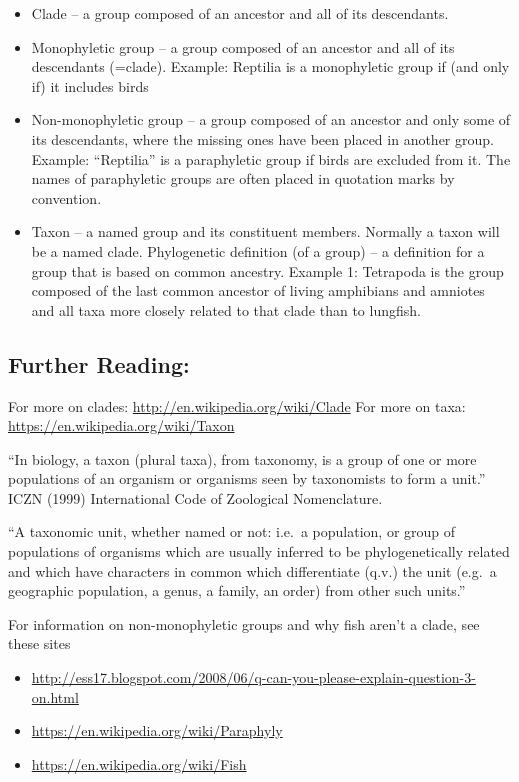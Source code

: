 \documentclass[
]{book}
\providecommand{\tightlist}{%
  \setlength{\itemsep}{0pt}\setlength{\parskip}{0pt}}
\begin{document}
\begin{itemize}
\tightlist
\item
  Clade -- a group composed of an ancestor and all of its descendants.
\item
  Monophyletic group -- a group composed of an ancestor and all of its descendants (=clade). Example: Reptilia is a monophyletic group if (and only if) it includes birds
\item
  Non-monophyletic group -- a group composed of an ancestor and only some of its descendants, where the missing ones have been placed in another group. Example: ``Reptilia'' is a paraphyletic group if birds are excluded from it. The names of paraphyletic groups are often placed in quotation marks by convention.
\item
  Taxon -- a named group and its constituent members. Normally a taxon will be a named clade. Phylogenetic definition (of a group) -- a definition for a group that is based on common ancestry. Example 1: Tetrapoda is the group composed of the last common ancestor of living amphibians and amniotes and all taxa more closely related to that clade than to lungfish.
\end{itemize}

\hypertarget{further-reading}{%
\subsection{Further Reading:}\label{further-reading}}

For more on clades: \url{http://en.wikipedia.org/wiki/Clade}
For more on taxa: \url{https://en.wikipedia.org/wiki/Taxon}

``In biology, a taxon (plural taxa), from taxonomy, is a group of one or more populations of an organism or organisms seen by taxonomists to form a unit.''
ICZN (1999) International Code of Zoological Nomenclature.

``A taxonomic unit, whether named or not: i.e.~a population, or group of populations of organisms which are usually inferred to be phylogenetically related and which have characters in common which differentiate (q.v.) the unit (e.g.~a geographic population, a genus, a family, an order) from other such units.''

For information on non-monophyletic groups and why fish aren't a clade, see these sites

\begin{itemize}
\tightlist
\item
  \url{http://ess17.blogspot.com/2008/06/q-can-you-please-explain-question-3-on.html}
\item
  \url{https://en.wikipedia.org/wiki/Paraphyly}
\item
  \url{https://en.wikipedia.org/wiki/Fish}
\end{itemize}
\end{document}
